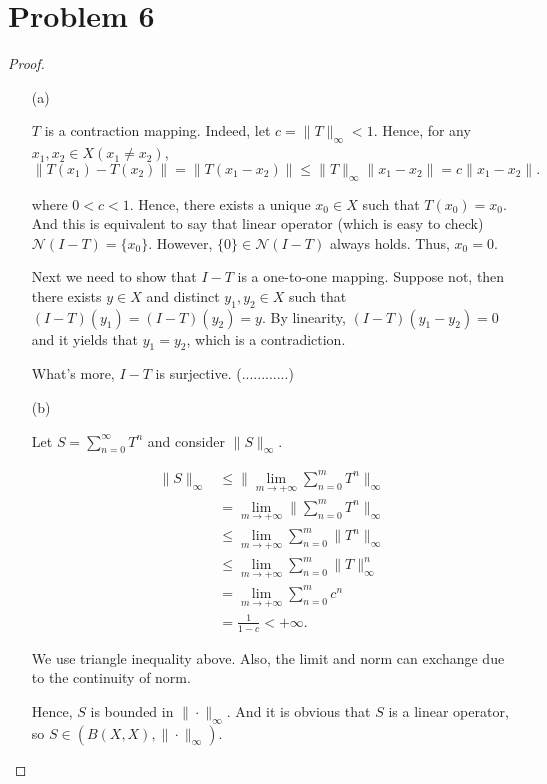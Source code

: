 \documentclass[12pt]{article}
\begin{document}
\section*{Problem 6}

\begin{proof}

\begin{enumerate}

\item [(a)]

$T$ is a contraction mapping. Indeed, let $ c = \|T\|_\infty < 1$. Hence, for any $x_1, x_2 \in X (x_1 \neq x_2)$, 
$$
\|T(x_1) - T(x_2)\| = \|T(x_1 - x_2)\| \leqslant \|T\|_\infty\|x_1 - x_2\| = c\|x_1 - x_2\|.
$$

where $0<c<1$. Hence, there exists a unique $x_0\in X$ such that $T(x_0) = x_0$. And this is equivalent to say that linear operator (which is easy to check) $ \mathcal N (I-T) = \{x_0\}$. However, $\{0\}\in \mathcal N (I-T)$ always holds. Thus, $x_0 = 0$. 

Next we need to show that $I-T$ is a one-to-one mapping. Suppose not, then there exists $y\in X$ and distinct $y_1, y_2 \in X$ such that $(I-T)(y_1) = (I-T)(y_2) = y $. By linearity, $(I-T)(y_1 - y_2) = 0$ and it yields that $y_1 = y_2$, which is a contradiction. 

What's more, $I-T$ is surjective. (............)

\item [(b)]

Let $S = \sum_{n=0}^\infty T^n$ and consider $\|S\|_\infty$.

$$
\begin{aligned}
\|S\|_\infty & \leqslant \|\lim_{m\rightarrow +\infty}\sum_{n=0}^mT^n\|_\infty \\
& =  \lim_{m\rightarrow +\infty}\|\sum_{n=0}^mT^n\|_\infty \\
& \leqslant \lim_{m\rightarrow +\infty}\sum_{n=0}^m \|T^n\|_\infty \\
& \leqslant \lim_{m\rightarrow +\infty}\sum_{n=0}^m\|T\|^n_\infty \\
& = \lim_{m\rightarrow +\infty}\sum_{n=0}^m c^n \\
& = \frac{1}{1-c} < +\infty.
\end{aligned}
$$

We use triangle inequality above. Also, the limit and norm can exchange due to the continuity of norm. 

Hence, $S$ is bounded in $\|\cdot\|_\infty$. And it is obvious that $S$ is a linear operator, so $S\in (B(X, X), \|\cdot\|_\infty)$.


\end{enumerate}
\end{proof}
\end{document}
